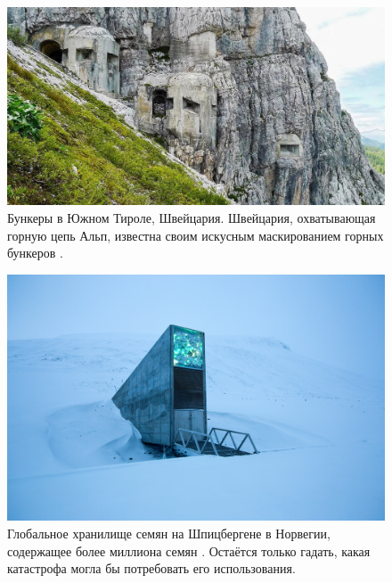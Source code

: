 \documentclass[10pt,twocolumn,letterpaper]{article}
\begin{document}
\begin{figure}[t]
\begin{center}
   \includegraphics[width=1\linewidth]{tyrol.jpg}
\end{center}
   \caption{Бункеры в Южном Тироле, Швейцария. Швейцария, охватывающая горную цепь Альп, известна своим искусным маскированием горных бункеров \cite{32}.}
\label{fig:7}
\label{fig:onecol}
\end{figure}

\begin{figure}[t]
\begin{center}
   \includegraphics[width=1\linewidth]{svalbard.jpg}

\end{center}
   \caption{Глобальное хранилище семян на Шпицбергене в Норвегии, содержащее более миллиона семян \cite{24}. Остаётся только гадать, какая катастрофа могла бы потребовать его использования.}
\label{fig:8}
\label{fig:onecol}
\end{figure}
\end{document}
